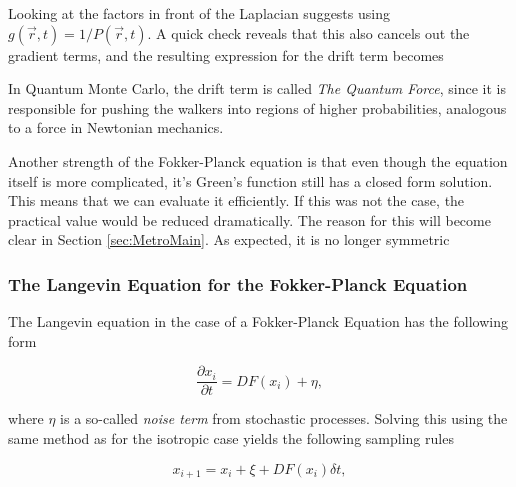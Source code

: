 Looking at the factors in front of the Laplacian suggests using $g(\vec r, t) = 1/P(\vec r, t)$. A quick check reveals that this also cancels out the gradient terms, and the resulting expression for the drift term becomes



In Quantum Monte Carlo, the drift term is called \textit{The Quantum Force}, since it is responsible for pushing the walkers into regions of higher probabilities, analogous to a force in Newtonian mechanics.

Another strength of the Fokker-Planck equation is that even though the equation itself is more complicated, it's Green's function still has a closed form solution. This means that we can evaluate it efficiently. If this was not the case, the practical value would be reduced dramatically. The reason for this will become clear in Section \ref{sec:MetroMain}. As expected, it is no longer symmetric 


\subsubsection{The Langevin Equation for the Fokker-Planck Equation}

The Langevin equation in the case of a Fokker-Planck Equation has the following form

\begin{equation}
 \frac{\partial x_i}{\partial t} = D F(x_i) + \eta,
\end{equation}

where $\eta$ is a so-called \textit{noise term} from stochastic processes. Solving this using the same method as for the isotropic case yields the following sampling rules

\begin{equation}
 \label{eq:langevinSolFP}
 x_{i+1} = x_i + \xi + DF(x_i)\delta t,
\end{equation}

